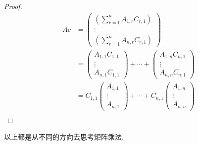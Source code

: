 \documentclass{article}
\begin{document}
\begin{proof}
$$
\begin{aligned}
Ac &=  
\begin{pmatrix}
\left(\sum\limits_{r=1}^{n}A_{1,r}C_{r,1}\right)  \\
\vdots \\
\left(\sum\limits_{r=1}^{n}A_{n,r}C_{r,1}\right)  
\end{pmatrix} \\
&= 
\begin{pmatrix}
A_{1,1}C_{1,1} \\
\vdots \\
A_{n,1}C_{1,1} 
\end{pmatrix} + \cdots +
\begin{pmatrix}
A_{1,n}C_{n,1} \\
\vdots \\
A_{n,n}C_{n,1} 
\end{pmatrix}\\ 
&= 
C_{1,1}\begin{pmatrix}
A_{1,1} \\
\vdots \\
A_{n,1} 
\end{pmatrix} + \cdots +
C_{n,1}\begin{pmatrix}
A_{1,n} \\
\vdots \\
A_{n,n} 
\end{pmatrix}\\
\end{aligned}
$$
\end{proof}

以上都是从不同的方向去思考矩阵乘法.
\end{document}
